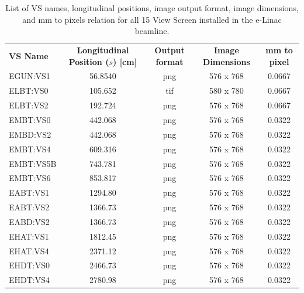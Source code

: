 \documentclass{article}
\begin{document}
\begin{table}[h!]
    \centering
        \begin{tabular}{ l   c   c   c   c}
            \toprule
             \multirow{2}{8em}{\textbf{VS Name}} & \multirow{2}{10em}{\textbf{Longitudinal Position ($s$) [cm]}}  & \multirow{2}{4em}{\textbf{Output format}}  & \multirow{2}{6em}{\textbf{Image Dimensions}} & \multirow{2}{4em}{\textbf{mm to pixel}} \\
             & & & \textbf{} &  \\
            \midrule
            EGUN:VS1 & 56.8540 & png & 576 x 768 & 0.0667   \\ 
            ELBT:VS0 &  105.652 & tif & 580 x 780 & 0.0667  \\ 
            ELBT:VS2 &  192.724 & png & 576 x 768 & 0.0667  \\ 
            EMBT:VS0  &  442.068 & png & 576 x 768 & 0.0322 \\ 
            EMBD:VS2  &  442.068 & png & 576 x 768 & 0.0322 \\ 
            EMBT:VS4  &  609.316 & png & 576 x 768 & 0.0322 \\ 
            EMBT:VS5B  &  743.781 & png & 576 x 768 & 0.0322\\ 
            EMBT:VS6  &  853.817 & png & 576 x 768 & 0.0322 \\ 
            EABT:VS1  &  1294.80 & png & 576 x 768 & 0.0322 \\ 
            EABT:VS2  &  1366.73 & png & 576 x 768 & 0.0322 \\ 
            EABD:VS2  &  1366.73 & png & 576 x 768 & 0.0322 \\ 
            EHAT:VS1  &  1812.45 & png & 576 x 768 & 0.0322 \\ 
            EHAT:VS4  &  2371.12 & png & 576 x 768 & 0.0322 \\ 
            EHDT:VS0  &  2466.73 & png & 576 x 768 & 0.0322 \\ 
            EHDT:VS4  &  2780.98 & png & 576 x 768 & 0.0322 \\  
            \bottomrule
        \end{tabular}
    \caption{List of VS names, longitudinal positions, image output format, image dimensions, and mm to pixels relation for all 15 View Screen installed in the e-Linac beamline.}
    \label{table:vs_name}
\end{table}

\newpage
\end{document}
